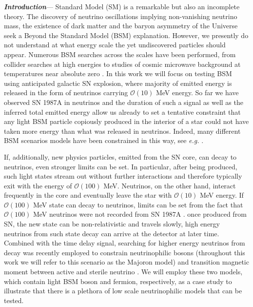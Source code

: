 \textbf{\textit{Introduction}}---
Standard Model (SM) is a remarkable but also an incomplete theory. The discovery of neutrino oscillations implying non-vanishing neutrino mass, the existence of dark matter and the baryon asymmetry of the Universe seek a Beyond the Standard Model (BSM) explanation. However, we presently do not understand at what energy scale the yet undiscovered particles should appear. Numerous BSM searches across the scales have been performed, from collider searches at high energies \cite{Nath:2010zj} to studies of cosmic microwave background at temperatures near absolute zero \cite{Baumann:2015rya}. In this work we will focus on testing BSM using anticipated galactic SN explosion, where majority of emitted energy is released in the form of neutrinos carrying $\mathcal{O}(10)$ MeV energy. So far we have observed SN 1987A in neutrinos and the duration of such a signal \cite{Kamiokande-II:1987idp,Bionta:1987qt,Baksan} as well as the inferred total emitted energy \cite{Loredo:2001rx,Pagliaroli:2008ur,Huedepohl2010} allow us already to set a tentative constraint that any light BSM particle copiously produced in the interior of a star could not have taken more energy than what was released in neutrinos. Indeed, many different BSM scenarios models have been constrained in this way, see \emph{e.g.} \cite{Raffelt:2011nc,Arguelles:2016uwb,Suliga:2020vpz,Lucente:2021hbp,Caputo:2022rca,Caputo:2021rux,PhysRevD.100.083002,DeRocco:2019njg,Kazanas:2014mca,Magill:2018jla}.

 If, additionally, new physics particles, emitted from the SN core, can decay to neutrinos, even stronger limits can be set. In particular, after being produced, such light states stream out without further interactions and therefore typically exit with the energy of $\mathcal{O}(100)$ MeV. Neutrinos, on the other hand, interact frequently in the core and eventually leave the star with $\mathcal{O}(10)$ MeV energy. If $\mathcal{O}(100)$ MeV state can decay to neutrinos, limits can be set from the fact that $\mathcal{O}(100)$ MeV neutrinos were not recorded from SN 1987A \cite{Kamiokande-II:1987idp,Bionta:1987qt,Baksan}. once produced from SN, the new state can be non-relativistic and travels slowly, high energy neutrinos from such state decay can arrive at the detector at later time. 
 Combined with the time delay signal, searching for higher energy neutrinos from decay was recently employed to constrain neutrinophilic bosons \cite{Fiorillo:2022cdq} (throughout this work we will refer to this scenario as the Majoron model) and transition magnetic moment between active and sterile neutrino \cite{Brdar:2023tmi}. %
 We will employ these two models, which contain light BSM boson and fermion, respectively,  as a case study to illustrate that there is a plethora of low scale neutrinophilic models that can be tested.

